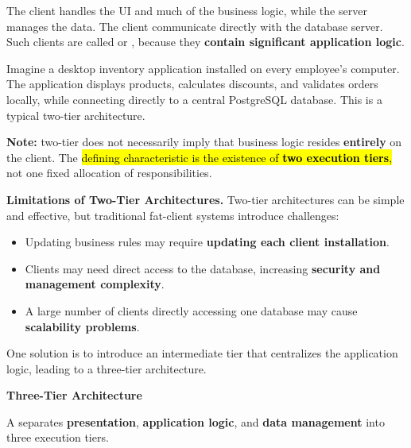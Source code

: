 \noindent
The client handles the UI and much of the business logic, while the server manages the data. The client communicate directly with the database server. Such clients are called  or , because they \textbf{contain significant application logic}.

\begin{examplebox}
    Imagine a desktop inventory application installed on every employee's computer.
    The application displays products, calculates discounts, and validates orders locally, while connecting directly to a central PostgreSQL database.
    This is a typical two-tier architecture.
\end{examplebox}

\noindent
\textcolor{DarkOrange3}{ \textbf{Note:}} two-tier does not necessarily imply that business logic resides \textbf{entirely} on the client. The \hl{defining characteristic is the existence of \textbf{two execution tiers},} not one fixed allocation of responsibilities.

\highspace
\textcolor{Red2}{ \textbf{Limitations of Two-Tier Architectures.}} Two-tier architectures can be simple and effective, but traditional fat-client systems introduce challenges:
\begin{itemize}
    \item Updating business rules may require \textbf{updating each client installation}.
    \item Clients may need direct access to the database, increasing \textbf{security and management complexity}.
    \item A large number of clients directly accessing one database may cause \textbf{scalability problems}.
\end{itemize}
One solution is to introduce an intermediate tier that centralizes the application logic, leading to a three-tier architecture.

\highspace
\begin{flushleft}
    \textcolor{Green3}{ \textbf{Three-Tier Architecture}}
\end{flushleft}
A  separates \textbf{presentation}, \textbf{application logic}, and \textbf{data management} into three execution tiers.

